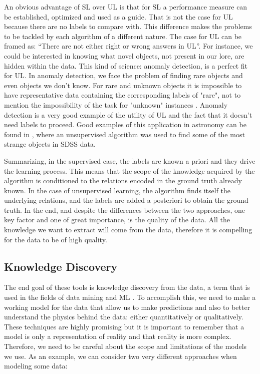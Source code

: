 An obvious advantage of SL over UL is that for SL a performance measure can be established, optimized and used as a guide. That is not the case for UL because there are no labels to compare with. This difference makes the problems to be tackled by each algorithm of a different nature. The case for UL can be framed as: ``There are not either right or wrong answers in UL''. For instance, we could be interested in knowing what novel objects, not present in our lore, are hidden within the data. This kind of science: anomaly detection, is a perfect fit for UL. In anomaly detection, we face the problem of finding rare objects and even objects we don’t know. For rare and unknown objects it is impossible to have representative data containing the corresponding labels of "rare", not to mention the impossibility of the task for "unknown" instances \cite{Norris2017}. Anomaly detection is a very good example of the utility of UL and the fact that it doesn't need labels to proceed. Good examples of this application in astronomy can be found in  \cite{Baron2017, Reis2018a}, where an unsupervised algorithm was used to find some of the most strange objects in SDSS data.

Summarizing, in the supervised case, the labels are known a priori and they drive the learning process. This means that the scope of the knowledge acquired by the algorithm is conditioned to the relations encoded in the ground truth already known. In the case of unsupervised learning, the algorithm finds itself the underlying relations, and the labels are added a posteriori to obtain the ground truth. In the end, and despite the differences between the two approaches, one key factor and one of great importance, is the quality of the data. All the knowledge we want to extract will come from the data, therefore it is compelling for the data to be of high quality.

\subsection{Knowledge Discovery}

The end goal of these tools is knowledge discovery from the data, a term that is used in the fields of data mining and ML \cite{IvezicBook2014}. To accomplish this, we need to make a working model for the data that allow us to make predictions and also to better understand the physics behind the data: either quantitatively or qualitatively. These techniques are highly promising but it is important to remember that a model is only a representation of reality and that reality is more complex. Therefore, we need to be careful about the scope and limitations of the models we use. As an example, we can consider two very different approaches when modeling some data:

